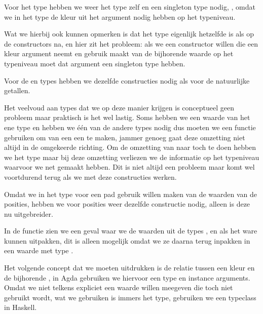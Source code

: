 Voor het  type hebben we weer het type zelf en een singleton type
nodig, , omdat we in het  type de kleur uit
het argument nodig hebben op het typeniveau.


Wat we hierbij ook kunnen opmerken is dat het type 
eigenlijk hetzelfde is als  op de constructors na, en hier zit
het probleem: als we een constructor willen die een kleur argument neemt en
gebruik maakt van de bijhorende waarde op het typeniveau moet dat argument een
singleton type hebben.

Voor de  en  types hebben we dezelfde
constructies nodig als voor de natuurlijke getallen.


Het veelvoud aan types dat we op deze manier krijgen is conceptueel geen
probleem maar praktisch is het wel lastig. Soms hebben we een waarde van het
ene type en hebben we één van de andere types nodig dus moeten we een functie
gebruiken om van een  een  te maken, jammer genoeg
gaat deze omzetting niet altijd in de omgekeerde richting. Om de omzetting van
 naar  toch te doen hebben we het type
 maar bij deze omzetting verliezen we de informatie op het
typeniveau waarvoor we  net gemaakt hebben. Dit is niet altijd een
probleem maar komt wel voortdurend terug als we met deze constructies werken.

Omdat we in het type voor een pad gebruik willen maken van de waarden van de
posities, hebben we voor posities weer dezelfde constructie nodig, alleen is
deze nu uitgebreider.


In de functie  zien we een geval waar
we de waarden uit de types ,  en   als
het ware kunnen uitpakken, dit is alleen mogelijk omdat we ze daarna terug
inpakken in een waarde met type .

Het volgende concept dat we moeten uitdrukken is de relatie tussen een kleur en
de bijhorende , in Agda gebruiken we hiervoor een type en
instance arguments. Omdat we niet telkens expliciet een waarde willen meegeven
die toch niet gebruikt wordt, wat we gebruiken is immers het type, gebruiken we
een typeclass in Haskell.

